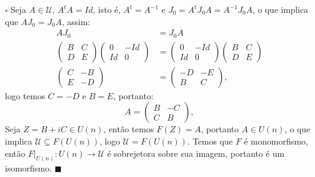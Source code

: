 \documentclass[12pt]{book}
\newenvironment{prova}[1]{$\square$ #1}{\hfill$\blacksquare$}
\newcommand{\matrizunitaria}[1]{U(#1)}
\begin{document}
\begin{prova}
		Seja $A \in \mathcal{U}$, $A^{t}A=Id$, isto é, $A^{t}=A^{-1}$ e $J_{0}=A^{t}J_{0}A=A^{-1}J_{0}A$, o que implica que $AJ_{0}=J_{0}A$, assim:
		$$
		\begin{aligned}
			AJ_{0}&=J_{0}A
			\\
			\left(
			\begin{array}{cc}
			B & C
			\\
			D & E
			\end{array}
			\right)
			\left(
			\begin{array}{cc}
			0 & -Id
			\\
			Id & 0
			\end{array}
			\right)
			&=
			\left(
			\begin{array}{cc}
			0 & -Id
			\\
			Id & 0
			\end{array}
			\right)
			\left(
			\begin{array}{cc}
			B & C
			\\
			D & E
			\end{array}
			\right)
			\\
			\left(
			\begin{array}{cc}
			C & -B
			\\
			E & -D
			\end{array}
			\right)
			&=
			\left(
			\begin{array}{cc}
			-D & -E
			\\
			B & C
			\end{array}
			\right), 
		\end{aligned}
		$$
		logo temos $C=-D$ e $B=E$, portanto:
		$$
		A=\left(
		\begin{array}{cc}
		B & -C
		\\
		C & B
		\end{array}
		\right),
		$$
		Seja $Z = B+iC \in \matrizunitaria{n}$, então temos $F(Z) = A$, portanto $A\in \matrizunitaria{n}$, o que implica $\mathcal{U} \subseteq F(\matrizunitaria{n})$, logo $\mathcal{U} = F(\matrizunitaria{n})$. Temos que $F$ é monomorfismo, então $F|_{\matrizunitaria{n}}:\matrizunitaria{n} \to \mathcal{U}$ é sobrejetora sobre sua imagem, portanto é um isomorfismo.
	\end{prova}
\end{document}
